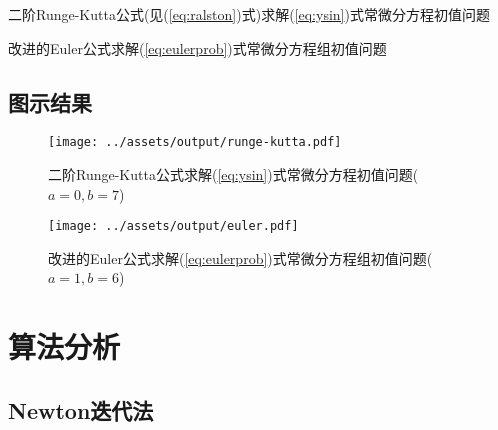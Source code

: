 \documentclass{nedsart}
\begin{document}
\begin{table}[H]
    \centering
    \caption{二阶Runge-Kutta公式(见(\ref{eq:ralston})式)求解(\ref{eq:ysin})式常微分方程初值问题}
    \label{tab:rk}
\end{table}

\begin{table}[H]
    \centering
    \caption{改进的Euler公式求解(\ref{eq:eulerprob})式常微分方程组初值问题}
    \label{tab:euler}
\end{table}

\subsection{图示结果}

\begin{figure}[H]
    \centering
    \texttt{[image: ../assets/output/runge-kutta.pdf]}
    \caption{二阶Runge-Kutta公式求解(\ref{eq:ysin})式常微分方程初值问题($a=0,b=7$)}
    \label{fig:rk}
\end{figure}

\begin{figure}[H]
    \centering
    \texttt{[image: ../assets/output/euler.pdf]}
    \caption{改进的Euler公式求解(\ref{eq:eulerprob})式常微分方程组初值问题($a=1,b=6$)}
    \label{fig:euler}
\end{figure}

\section{算法分析}

\subsection{Newton迭代法}
\end{document}
